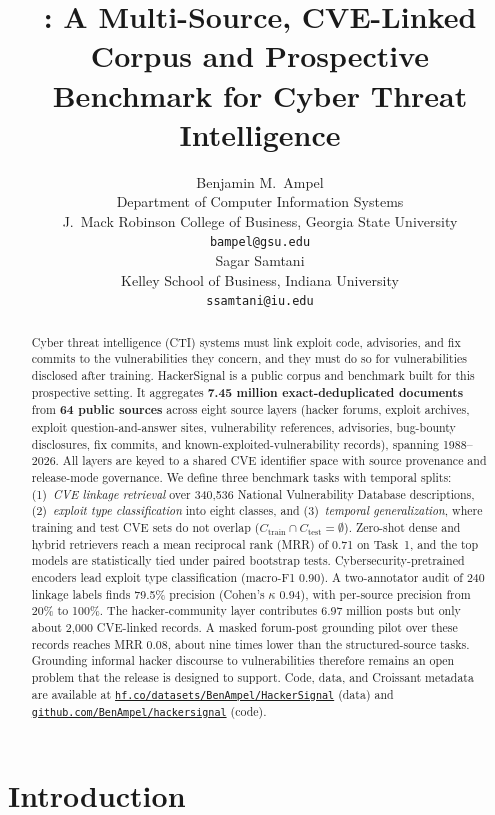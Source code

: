 \documentclass{article}
\title{\etg: A Multi-Source, CVE-Linked Corpus and Prospective
       Benchmark for Cyber Threat Intelligence}
\author{%
  Benjamin M.\ Ampel \\
  Department of Computer Information Systems \\
  J.\ Mack Robinson College of Business, Georgia State University \\
  \texttt{bampel@gsu.edu} \\
  \And
  Sagar Samtani \\
  Kelley School of Business, Indiana University \\
  \texttt{ssamtani@iu.edu} \\
}
\begin{document}
\maketitle

\begin{abstract}

Cyber threat intelligence (CTI) systems must link exploit code, advisories, and fix commits to the vulnerabilities they concern, and they must do so for vulnerabilities disclosed after training. HackerSignal is a public corpus and benchmark built for this prospective setting. It aggregates \textbf{7.45 million exact-deduplicated documents} from \textbf{64 public sources} across eight source layers (hacker forums, exploit archives, exploit question-and-answer sites, vulnerability references, advisories, bug-bounty disclosures, fix commits, and known-exploited-vulnerability records), spanning 1988--2026. All layers are keyed to a shared CVE identifier space with source provenance and release-mode governance. We define three benchmark tasks with temporal splits: (1)~\emph{CVE linkage retrieval} over 340,536 National Vulnerability Database descriptions, (2)~\emph{exploit type classification} into eight classes, and (3)~\emph{temporal generalization}, where training and test CVE sets do not overlap ($C_{\text{train}} \cap C_{\text{test}} = \emptyset$). Zero-shot dense and hybrid retrievers reach a mean reciprocal rank (MRR) of 0.71 on Task~1, and the top models are statistically tied under paired bootstrap tests. Cybersecurity-pretrained encoders lead exploit type classification (macro-F1 0.90). A two-annotator audit of 240 linkage labels finds 79.5\% precision (Cohen's $\kappa$ 0.94), with per-source precision from 20\% to 100\%.
The hacker-community layer contributes 6.97 million posts but only about 2,000 CVE-linked records. A masked forum-post grounding pilot over these records reaches MRR 0.08, about nine times lower than the structured-source tasks. Grounding informal hacker discourse to vulnerabilities therefore remains an open problem that the release is designed to support. Code, data, and Croissant metadata are available at \href{https://huggingface.co/datasets/BenAmpel/HackerSignal}{\texttt{hf.co/datasets/BenAmpel/HackerSignal}} (data) and \href{https://github.com/BenAmpel/hackersignal}{\texttt{github.com/BenAmpel/hackersignal}} (code).
\end{abstract}

\section{Introduction}
\end{document}
